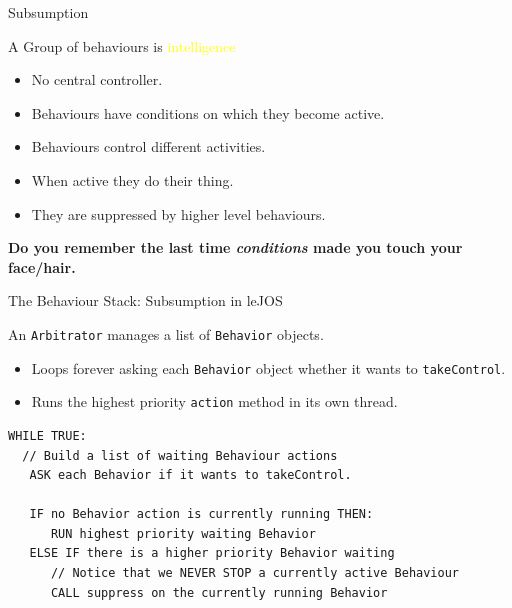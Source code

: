 \documentclass[color=pdftex,usenames,dvipsnames, aspectratio=169]{beamer}
\begin{document}
\begin{frame}{Subsumption}
\begin{block}{A Group of behaviours is  \textcolor{yellow}{intelligence}}
\begin{itemize}
\item \alert{No central controller}.
\item Behaviours have \alert{conditions} on which they become active.
\item Behaviours control different \alert{activities}.
\item When \alert{active} they do their thing.
\item They are \alert{suppressed} by \alert{higher level} behaviours.
\end{itemize}

\textcolor{OliveGreen}{\textbf{Do you remember the last time \emph{conditions} made you touch your face/hair.}}
\end{block}
\end{frame}

\begin{frame}[fragile]{The Behaviour Stack: Subsumption in leJOS}
\begin{block}{An \lstinline[identifierstyle=\bfseries\color{yellow}]{Arbitrator} manages a list of \lstinline[identifierstyle=\bfseries\color{yellow}]!Behavior! objects.}
\begin{itemize}
\item \textcolor{BrickRed}{Loops forever} asking each \lstinline!Behavior! object whether it wants to \lstinline!takeControl!.
\item \textcolor{OliveGreen}{Runs the highest priority \lstinline!action! method} in its own thread.
\end{itemize}
\end{block}

\begin{lstlisting}[emph={Behavior,suppress,takeControl,action}]
WHILE TRUE:
  // Build a list of waiting Behaviour actions
   ASK each Behavior if it wants to takeControl.

   IF no Behavior action is currently running THEN:
      RUN highest priority waiting Behavior
   ELSE IF there is a higher priority Behavior waiting
      // Notice that we NEVER STOP a currently active Behaviour
      CALL suppress on the currently running Behavior

\end{lstlisting}
\end{frame}
\end{document}

